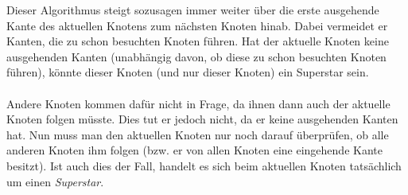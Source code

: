 \documentclass[a4paper, notitlepage, 12pt]{scrartcl}
\begin{document}
Dieser Algorithmus steigt sozusagen immer weiter über die erste ausgehende Kante des aktuellen Knotens zum nächsten Knoten hinab. Dabei vermeidet er Kanten, die zu schon besuchten Knoten führen. Hat der aktuelle Knoten keine ausgehenden Kanten (unabhängig davon, ob diese zu schon besuchten Knoten führen), könnte dieser Knoten (und nur dieser Knoten) ein Superstar sein.
\\ \\
Andere Knoten kommen dafür nicht in Frage, da ihnen dann auch der aktuelle Knoten folgen müsste. Dies tut er jedoch nicht, da er keine ausgehenden Kanten hat. Nun muss man den aktuellen Knoten nur noch darauf überprüfen, ob alle anderen Knoten ihm folgen (bzw. er von allen Knoten eine eingehende Kante besitzt). Ist auch dies der Fall, handelt es sich beim aktuellen Knoten tatsächlich um einen \textit{Superstar}.
\end{document}
